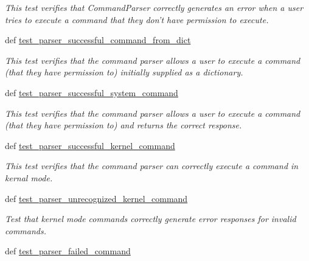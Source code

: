 \begin{DoxyCompactItemize}
\begin{DoxyCompactList}\small\item\em This test verifies that Command\-Parser correctly generates an error when a user tries to execute a command that they don't have permission to execute. \end{DoxyCompactList}\item 
def \hyperlink{classhwm_1_1command_1_1tests_1_1test__command__infrastructure_1_1_test_command_infrastructure_a775b2126b536b55b71ab9ede73f44cb1}{test\-\_\-parser\-\_\-successful\-\_\-command\-\_\-from\-\_\-dict}
\begin{DoxyCompactList}\small\item\em This test verifies that the command parser allows a user to execute a command (that they have permission to) initially supplied as a dictionary. \end{DoxyCompactList}\item 
def \hyperlink{classhwm_1_1command_1_1tests_1_1test__command__infrastructure_1_1_test_command_infrastructure_a279faad9b4a18dbf49c279c09b5da2b1}{test\-\_\-parser\-\_\-successful\-\_\-system\-\_\-command}
\begin{DoxyCompactList}\small\item\em This test verifies that the command parser allows a user to execute a command (that they have permission to) and returns the correct response. \end{DoxyCompactList}\item 
def \hyperlink{classhwm_1_1command_1_1tests_1_1test__command__infrastructure_1_1_test_command_infrastructure_a217e8deea1453e23f2eae3f5b0d578b1}{test\-\_\-parser\-\_\-successful\-\_\-kernel\-\_\-command}
\begin{DoxyCompactList}\small\item\em This test verifies that the command parser can correctly execute a command in kernal mode. \end{DoxyCompactList}\item 
def \hyperlink{classhwm_1_1command_1_1tests_1_1test__command__infrastructure_1_1_test_command_infrastructure_a49d2b0bdd9800a1e9b70980b4fcd82cd}{test\-\_\-parser\-\_\-unrecognized\-\_\-kernel\-\_\-command}
\begin{DoxyCompactList}\small\item\em Test that kernel mode commands correctly generate error responses for invalid commands. \end{DoxyCompactList}\item 
def \hyperlink{classhwm_1_1command_1_1tests_1_1test__command__infrastructure_1_1_test_command_infrastructure_a6d87eb0bc2ea1790c33b529457a37f38}{test\-\_\-parser\-\_\-failed\-\_\-command}

\end{DoxyCompactItemize}
